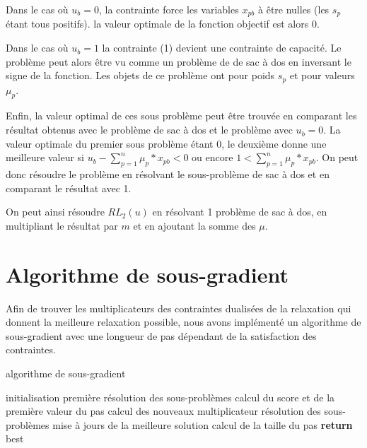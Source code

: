 \documentclass{article}
\begin{document}
Dans le cas où $u_b = 0$, la contrainte force les variables $x_{pb}$ à être nulles (les $s_p$ étant tous positifs).
la valeur optimale de la fonction objectif est alors $0$. \newline

Dans le cas où $u_b = 1$ la contrainte (1) devient une contrainte de capacité.
Le problème peut alors être vu comme un problème de de sac à dos en inversant le signe de la fonction.
Les objets de ce problème ont pour poids $s_p$ et pour valeurs $\mu_p$. \newline

Enfin, la valeur optimal de ces sous problème peut être trouvée en comparant les résultat obtenus avec le problème de sac à dos et le problème avec $u_b = 0$.
La valeur optimale du premier sous problème étant $0$, le deuxième donne une meilleure valeur si $u_b - \sum_{p=1}^n \mu_p*x_{pb} < 0$ ou encore $1 < \sum_{p=1}^n \mu_p*x_{pb}$.
On peut donc résoudre le problème en résolvant le sous-problème de sac à dos et en comparant le résultat avec 1.\newline

On peut ainsi résoudre $RL_2(u)$ en résolvant 1 problème de sac à dos, en multipliant le résultat par $m$ et en ajoutant la somme des $\mu$.

\section{Algorithme de sous-gradient}

Afin de trouver les multiplicateurs des contraintes dualisées de la relaxation qui donnent la meilleure relaxation possible, nous avons implémenté un algorithme de sous-gradient avec une longueur de pas dépendant de la satisfaction des contraintes.

\begin{algorithm}
\caption{algorithme de sous-gradient}
\begin{algorithmic}[1]
	\State initialisation
	\State première résolution des sous-problèmes
	\State calcul du score et de la première valeur du pas
		\State calcul des nouveaux multiplicateur
		\State résolution des sous-problèmes
		\State mise à jours de la meilleure solution
		\State calcul de la taille du pas
	\EndWhile
	\State \textbf{return} best
\EndFunction
\end{algorithmic}
\end{algorithm}
\end{document}
